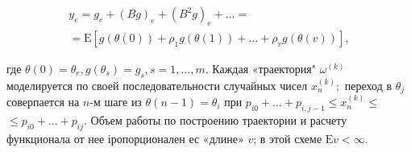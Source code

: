 \documentclass[10pt]{article}
\begin{document}
\[

\begin{gathered}

y_{e}=g_{e}+(B g)_{e}+\left(B^{2} g\right)_{e}+\ldots= \\

=\mathrm{E}\left[g(\theta(0))+\rho_{1} g(\theta(1))+\ldots+\rho_{v} g(\theta(v))\right],

\end{gathered}

\]



где $\theta(0)=\theta_{e}, g\left(\theta_{s}\right)=g_{s}, s=1, \ldots, m$. Каждая «траектория" $\omega^{(k)}$ моделируется по своей последовательности случайных чисел $x_{n}^{(k)} ;$ переход в $\theta_{j}$ соверпается на $n$-м шаге из $\theta(n-1)=\theta_{i}$ при $p_{i 0}+\ldots+p_{i, j-1} \leqslant x_{n}^{(k)} \leqslant$ $\leqslant p_{i 0}+\ldots+p_{i j}$. Объем работы по построению траектории и расчету функционала от нее іропорционален ес «длине» $v$; в этой схеме $\mathrm{E} v<\infty$.
\end{document}

